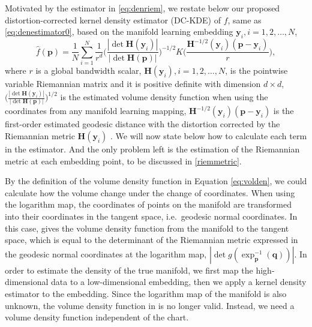 \documentclass[11pt,a4paper,]{article}
\begin{document}
Motivated by the estimator in \eqref{eq:denriem}, we restate below our proposed distortion-corrected kernel density estimator (DC-KDE) of \(f\), same as \eqref{eq:denestimator0}, based on the manifold learning embedding \(\pmb{y}_i, i = 1, 2, \dots, N\),
\begin{equation}
\label{eq:denestimator}
\hat{f}(\pmb{p}) = \frac{1}{N} \sum_{i=1}^{N} \frac{1}{r^d} \bigg(\frac{|\det \pmb{H}(\pmb{y}_i)|}{|\det \pmb{H}(\pmb{p})|} \bigg)^{-1/2} K\bigg( \frac{ \pmb{H}^{-1/2}(\pmb{y}_i) (\pmb{p} - \pmb{y}_i)}{r} \bigg),
\end{equation}
where \(r\) is a global bandwidth scalar, \(\pmb{H}(\pmb{y}_i), i = 1, 2, \dots, N\), is the pointwise variable Riemannian matrix and it is positive definite with dimension \(d\times d\), \(\bigg(\frac{|\det \pmb{H}(\pmb{y}_i)|}{|\det \pmb{H}(\pmb{p})|} \bigg)^{1/2}\) is the estimated volume density function when using the coordinates from any manifold learning mapping, \(\pmb{H}^{-1/2}(\pmb{y}_i) (\pmb{p} - \pmb{y}_i)\) is the first-order estimated geodesic distance with the distortion corrected by the Riemannian metric \(\pmb{H}(\pmb{y}_i)\)
. We will now state below how to calculate each term in the estimator. And the only problem left is the estimation of the Riemannian metric at each embedding point, to be discussed in \autoref{riemmetric}.

By the definition of the volume density function in Equation \eqref{eq:volden}, we could calculate how the volume change under the change of coordinates. When using the logarithm map, the coordinates of points on the manifold are transformed into their coordinates in the tangent space, i.e.~geodesic normal coordinates. In this case, \textcite{Pelletier2005-vu} gives the volume density function from the manifold to the tangent space, which is equal to the determinant of the Riemannian metric expressed in the geodesic normal coordinates at the logarithm map, \(|\det g(\exp^{-1}_{\pmb{p}}(\pmb{q})) |\).
In order to estimate the density of the true manifold, we first map the high-dimensional data to a low-dimensional embedding, then we apply a kernel density estimator to the embedding. Since the logarithm map of the manifold is also unknown, the volume density function in \textcite{Pelletier2005-vu} is no longer valid. Instead, we need a volume density function independent of the chart.
\end{document}
